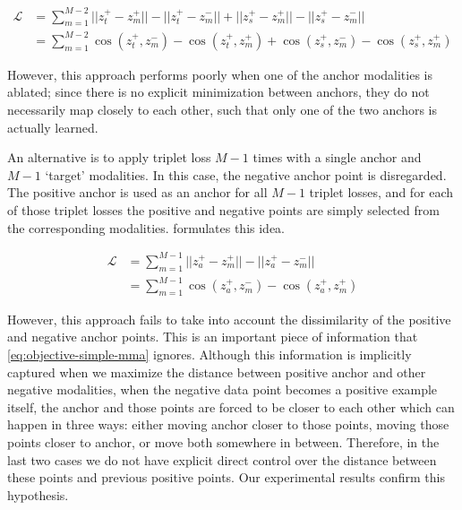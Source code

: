 \documentclass[10pt]{article} %
\begin{document}
\begin{equation}
\label{eq:objective-two-anchors}
\begin{split}
    \mathcal{L}  &= \sum_{m=1}^{M-2} || z_{t}^{+} - z_{m}^{+} || - || z_{t}^{+} - z_{m}^{-} || + || z_{s}^{+} - z_{m}^{+} || - || z_{s}^{+} - z_{m}^{-} || \\
    &= \sum_{m=1}^{M-2} \cos(z_{t}^{+} ,z_{m}^{-}) - \cos(z_{t}^{+}, z_{m}^{+}) + \cos(z_{s}^{+} ,z_{m}^{-}) - \cos(z_{s}^{+}, z_{m}^{+})
\end{split}
\end{equation}

However, this approach performs poorly when one of the anchor modalities is ablated; since there is no explicit minimization between anchors, they do not necessarily map closely to each other, such that only one of the two anchors is actually learned. 


An alternative is to apply triplet loss $M-1$ times with a single anchor and $M-1$ `target' modalities.  In this case, the negative anchor point is disregarded. The positive anchor is used as an anchor for all $M-1$ triplet losses, and for each of those triplet losses the positive and negative points are simply selected from the corresponding modalities.  formulates this idea.

\begin{equation}
\label{eq:objective-simple-mma}
\begin{split}
    \mathcal{L}  &= \sum_{m=1}^{M-1} || z_{a}^{+} - z_{m}^{+} || - || z_{a}^{+} - z_{m}^{-} || \\
    &= \sum_{m=1}^{M-1} \cos(z_{a}^{+} ,z_{m}^{-}) - \cos(z_{a}^{+}, z_{m}^{+})
\end{split}
\end{equation}

However, this approach fails to take into account the dissimilarity of the positive and negative anchor points. This is an important piece of information that \cref{eq:objective-simple-mma} ignores. Although this information is implicitly captured when we maximize the distance between positive anchor and other negative modalities, when the negative data point becomes a positive example itself, the anchor and those points are forced to be closer to each other which can happen in three ways: either moving anchor closer to those points, moving those points closer to anchor, or move both somewhere in between. Therefore, in the last two cases we do not have explicit direct control over the distance between these points and previous positive points. Our experimental results confirm this hypothesis.
\end{document}
